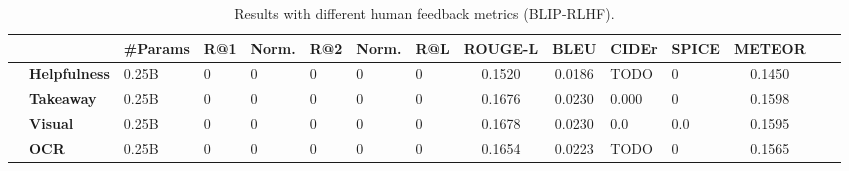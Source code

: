 \begin{table}[b!]
\centering
\renewcommand{\arraystretch}{1.1} 
\setlength{\tabcolsep}{6.9pt} 
\small
\begin{tabularx}{0.6\linewidth}{l l H HH HH Hc cH Hccc}
\toprule
&
& 
\textbf{\#Params} & 
R@1 & \sc Norm. & %
R@2 & \sc Norm. & %
R@L & 
\textbf{ROUGE-L} &
\textbf{BLEU} & 
\textbf{CIDEr} & 
\textbf{SPICE} &
\textbf{METEOR} &
\\ \midrule

& \textbf{Helpfulness} & 0.25B & 0 & 0 & 0 & 0 & 0 & 0.1520 & 0.0186 & TODO &  0 & 0.1450 \\ 
& \textbf{Takeaway} & 0.25B & 0 & 0 & 0 & 0 & 0 &   0.1676 &  0.0230 & 0.000  & 0 & 0.1598 \\ 
& \textbf{Visual} & 0.25B & 0 & 0 & 0 & 0 & 0 &  0.1678 &  0.0230 & 0.0  & 0.0 & 0.1595 \\ 
& \textbf{OCR} & 0.25B & 0 & 0 & 0 & 0 & 0 & 0.1654 & 0.0223 & TODO &  0 & 0.1565 \\ 


\bottomrule
\end{tabularx}
\caption{%
Results with different human feedback metrics (BLIP-RLHF).
}
\label{table:results-comparison-metrics}
\end{table}






